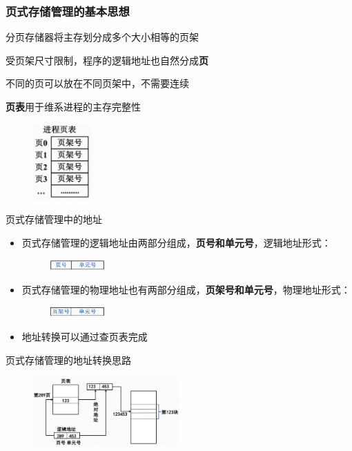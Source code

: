 \documentclass[cs4size,a4paper,10pt]{ctexart}
\begin{document}
		\subsubsection{页式存储管理的基本思想}
		分页存储器将主存划分成多个大小相等的页架

		受页架尺寸限制，程序的逻辑地址也自然分成\textbf{页}

		不同的页可以放在不同页架中，不需要连续

		\textbf{页表}用于维系进程的主存完整性
		\begin{figure}[H]
			\centering
			\includegraphics[width=0.2\textwidth]{img/3.3.1.1}
		\end{figure}
		页式存储管理中的地址
		\begin{itemize}
			\item 页式存储管理的逻辑地址由两部分组成，\textbf{页号和单元号}，逻辑地址形式：
			\begin{figure}[H]
				\centering
				\includegraphics[width=0.2\textwidth]{img/3.3.1.1.1}
			\end{figure}
			\item 页式存储管理的物理地址也有两部分组成，\textbf{页架号和单元号}，物理地址形式：
			\begin{figure}[H]
				\centering
				\includegraphics[width=0.2\textwidth]{img/3.3.1.1.2}
			\end{figure}
			\item 地址转换可以通过查页表完成
		\end{itemize}

		页式存储管理的地址转换思路
		\begin{figure}[H]
			\centering
			\includegraphics[width=0.5\textwidth]{img/3.3.1.1.3}
		\end{figure}
\end{document}
